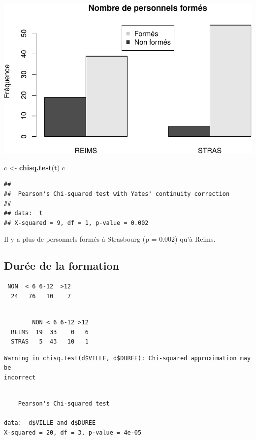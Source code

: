 \documentclass[]{article}
\newenvironment{Shaded}{\begin{snugshade}}{\end{snugshade}}
\newcommand{\KeywordTok}[1]{\textcolor[rgb]{0.13,0.29,0.53}{\textbf{{#1}}}}
\newcommand{\StringTok}[1]{\textcolor[rgb]{0.31,0.60,0.02}{{#1}}}
\newcommand{\NormalTok}[1]{{#1}}
\begin{document}
\includegraphics{analyse_files/figure-latex/unnamed-chunk-7-1.pdf}

\begin{Shaded}
\begin{Highlighting}[]
\NormalTok{c <-}\StringTok{ }\KeywordTok{chisq.test}\NormalTok{(t)}
\NormalTok{c}
\end{Highlighting}
\end{Shaded}

\begin{verbatim}
## 
##  Pearson's Chi-squared test with Yates' continuity correction
## 
## data:  t
## X-squared = 9, df = 1, p-value = 0.002
\end{verbatim}

Il y a plus de personnels formés à Strasbourg (p = 0.002) qu'à Reims.

\subsection{Durée de la formation}\label{duree-de-la-formation}

\begin{verbatim}
 NON  < 6 6-12  >12 
  24   76   10    7 
\end{verbatim}

\begin{verbatim}
       
        NON < 6 6-12 >12
  REIMS  19  33    0   6
  STRAS   5  43   10   1
\end{verbatim}

\begin{verbatim}
Warning in chisq.test(d$VILLE, d$DUREE): Chi-squared approximation may be
incorrect
\end{verbatim}

\begin{verbatim}

    Pearson's Chi-squared test

data:  d$VILLE and d$DUREE
X-squared = 20, df = 3, p-value = 4e-05
\end{verbatim}
\end{document}

